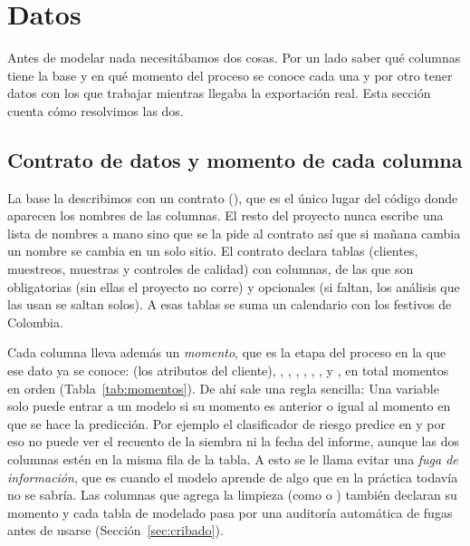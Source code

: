\section{Datos}
\label{sec:datos}

Antes de modelar nada necesitábamos dos cosas. Por un lado saber qué columnas
tiene la base y en qué momento del proceso se conoce cada una y por otro
tener datos con los que trabajar mientras llegaba la exportación real. Esta sección cuenta cómo
resolvimos las dos.

\subsection{Contrato de datos y momento de cada columna}

La base la describimos con un contrato (),
que es el único lugar del código donde aparecen los nombres de las columnas.
El resto del proyecto nunca escribe una lista de nombres a mano sino que se
la pide al contrato así que si mañana cambia un nombre se cambia en un solo
sitio. El contrato declara \DatTablasContrato{} tablas (clientes, muestreos,
muestras y controles de calidad) con \DatColumnasContrato{} columnas, de las
que \DatColumnasObligatorias{} son obligatorias (sin ellas el proyecto no
corre) y \DatColumnasOpcionales{} opcionales (si faltan, los análisis que las
usan se saltan solos). A esas tablas se suma un calendario con los festivos
de Colombia.

Cada columna lleva además un \emph{momento}, que es la etapa del proceso en
la que ese dato ya se conoce:  (los atributos del cliente),
, , , ,
, ,  y , en
total \DatMomentos{} momentos en orden (Tabla~\ref{tab:momentos}). De ahí sale
una regla sencilla: Una variable solo puede entrar a un modelo si su momento
es anterior o igual al momento en que se hace la predicción. Por ejemplo el
clasificador de riesgo predice en  y por eso no puede ver
el recuento de la siembra ni la fecha del informe, aunque las dos columnas
estén en la misma fila de la tabla. A esto se le llama evitar una
\emph{fuga de información}, que es cuando el modelo aprende de algo que en la
práctica todavía no se sabría. Las columnas que agrega la limpieza (como
 o ) también declaran su momento y
cada tabla de modelado pasa por una auditoría automática de fugas antes de
usarse (Sección~\ref{sec:cribado}).


